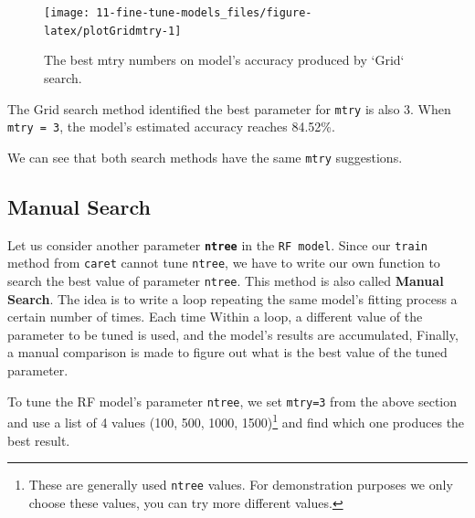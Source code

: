 \documentclass[
]{book}
\begin{document}
\begin{figure}

{\centering \texttt{[image: 11-fine-tune-models\_files/figure-latex/plotGridmtry-1]} 

}

\caption{The best mtry numbers on model's accuracy produced by `Grid` search.}\label{fig:plotGridmtry}
\end{figure}

The Grid search method identified the best parameter for \texttt{mtry} is also 3. When \texttt{mtry\ =\ 3}, the model's estimated accuracy reaches 84.52\%.

We can see that both search methods have the same \texttt{mtry} suggestions.

\hypertarget{manual-search}{%
\subsection*{Manual Search}\label{manual-search}}


Let us consider another parameter \textbf{\texttt{ntree}} in the \texttt{RF\ model}. Since our \texttt{train} method from \texttt{caret} cannot tune \texttt{ntree}, we have to write our own function to search the best value of parameter \texttt{ntree}. This method is also called \textbf{Manual Search}. The idea is to write a loop repeating the same model's fitting process a certain number of times. Each time Within a loop, a different value of the parameter to be tuned is used, and the model's results are accumulated, Finally, a manual comparison is made to figure out what is the best value of the tuned parameter.

To tune the RF model's parameter \texttt{ntree}, we set \texttt{mtry=3} from the above section and use a list of 4 values (100, 500, 1000, 1500)\footnote{These are generally used \texttt{ntree} values. For demonstration purposes we only choose these values, you can try more different values.} and find which one produces the best result.
\end{document}
